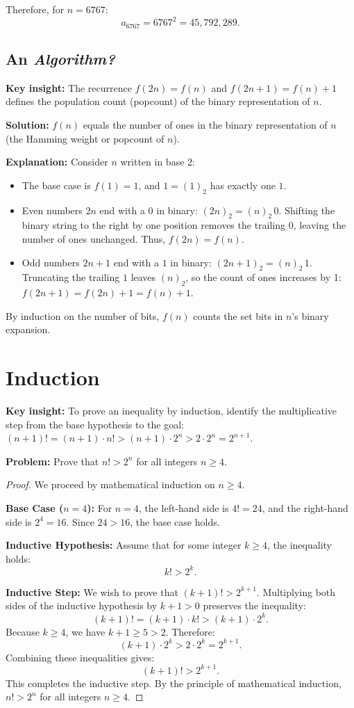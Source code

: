 \documentclass[12pt]{article}
\newcommand{\insight}[1]{\par\medskip\noindent\textbf{Key insight:} #1}
\begin{document}
Therefore, for $n = 6767$:
\[
a_{6767} = 6767^2 = 45{,}792{,}289.
\]

\subsection{An \textit{Algorithm?}}

\insight{The recurrence $f(2n) = f(n)$ and $f(2n+1) = f(n)+1$ defines the population count (popcount) of the binary representation of $n$.}

\textbf{Solution:}
$f(n)$ equals the number of ones in the binary representation of $n$ (the Hamming weight or popcount of $n$).

\textbf{Explanation:}
Consider $n$ written in base 2:
\begin{itemize}
    \item The base case is $f(1) = 1$, and $1 = (1)_2$ has exactly one $1$.
    \item Even numbers $2n$ end with a $0$ in binary: $(2n)_2 = (n)_2 \, 0$. Shifting the binary string to the right by one position removes the trailing $0$, leaving the number of ones unchanged. Thus, $f(2n) = f(n)$.
    \item Odd numbers $2n+1$ end with a $1$ in binary: $(2n+1)_2 = (n)_2 \, 1$. Truncating the trailing $1$ leaves $(n)_2$, so the count of ones increases by 1: $f(2n+1) = f(2n) + 1 = f(n) + 1$.
\end{itemize}
By induction on the number of bits, $f(n)$ counts the set bits in $n$'s binary expansion.

\section{Induction}

\insight{To prove an inequality by induction, identify the multiplicative step from the base hypothesis to the goal: $(n+1)! = (n+1) \cdot n! > (n+1) \cdot 2^n > 2 \cdot 2^n = 2^{n+1}$.}

\textbf{Problem:} Prove that $n! > 2^n$ for all integers $n \ge 4$.

\begin{proof}
We proceed by mathematical induction on $n \ge 4$.

\textbf{Base Case ($n = 4$):}
For $n = 4$, the left-hand side is $4! = 24$, and the right-hand side is $2^4 = 16$. Since $24 > 16$, the base case holds.

\textbf{Inductive Hypothesis:}
Assume that for some integer $k \ge 4$, the inequality holds:
\[
k! > 2^k.
\]

\textbf{Inductive Step:}
We wish to prove that $(k+1)! > 2^{k+1}$.
Multiplying both sides of the inductive hypothesis by $k + 1 > 0$ preserves the inequality:
\[
(k+1)! = (k+1) \cdot k! > (k+1) \cdot 2^k.
\]
Because $k \ge 4$, we have $k + 1 \ge 5 > 2$. Therefore:
\[
(k+1) \cdot 2^k > 2 \cdot 2^k = 2^{k+1}.
\]
Combining these inequalities gives:
\[
(k+1)! > 2^{k+1}.
\]
This completes the inductive step. By the principle of mathematical induction, $n! > 2^n$ for all integers $n \ge 4$.
\end{proof}
\end{document}
